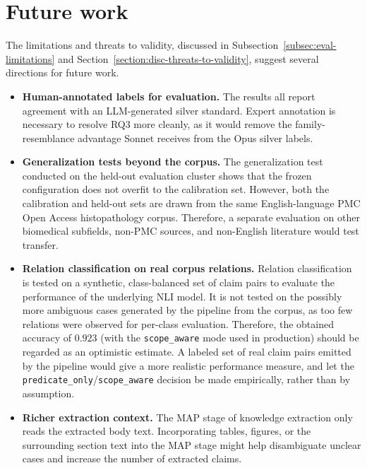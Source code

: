 \section{Future work}\label{section:future-work}

The limitations and threats to validity, discussed in Subsection~\ref{subsec:eval-limitations} and Section~\ref{section:disc-threats-to-validity}, suggest several directions for future work. 

\begin{itemize}[label={},leftmargin=1.5em]
    \item \textbf{Human-annotated labels for evaluation.} The results all report agreement with an LLM-generated silver standard. Expert annotation is necessary to resolve RQ3 more cleanly, as it would remove the family-resemblance advantage Sonnet receives from the Opus silver labels. 

    \item \textbf{Generalization tests beyond the corpus.} The generalization test conducted on the held-out evaluation cluster shows that the frozen configuration does not overfit to the calibration set. However, both the calibration and held-out sets are drawn from the same English-language PMC Open Access histopathology corpus. Therefore, a separate evaluation on other biomedical subfields, non-PMC sources, and non-English literature would test transfer.

    \item \textbf{Relation classification on real corpus relations.} Relation classification is tested on a synthetic, class-balanced set of claim pairs to evaluate the performance of the underlying NLI model. It is not tested on the possibly more ambiguous cases generated by the pipeline from the corpus, as too few relations were observed for per-class evaluation. Therefore, the obtained accuracy of $0.923$ (with the \texttt{scope\_aware} mode used in production) should be regarded as an optimistic estimate. A labeled set of real claim pairs emitted by the pipeline would give a more realistic performance measure, and let the \texttt{predicate\_only}/\texttt{scope\_aware} decision be made empirically, rather than by assumption.

    \item \textbf{Richer extraction context.} The MAP stage of knowledge extraction only reads the extracted body text. Incorporating tables, figures, or the surrounding section text into the MAP stage might help disambiguate unclear cases and increase the number of extracted claims. 


\end{itemize}
